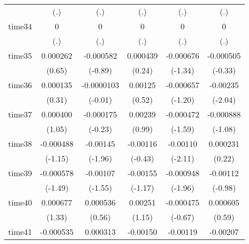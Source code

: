 \begin{table}[htbp]
\begin{tabular}{l*{5}{c}}
            &         (.)         &         (.)         &         (.)         &         (.)         &         (.)         \\
time34      &           0         &           0         &           0         &           0         &           0         \\
            &         (.)         &         (.)         &         (.)         &         (.)         &         (.)         \\
time35      &    0.000262         &   -0.000582         &    0.000439         &   -0.000676         &   -0.000505         \\
            &      (0.65)         &     (-0.89)         &      (0.24)         &     (-1.34)         &     (-0.33)         \\
time36      &    0.000135         &  -0.0000103         &     0.00125         &   -0.000657         &    -0.00235\sym{*}  \\
            &      (0.31)         &     (-0.01)         &      (0.52)         &     (-1.20)         &     (-2.04)         \\
time37      &    0.000400         &   -0.000175         &     0.00239         &   -0.000472         &   -0.000888         \\
            &      (1.05)         &     (-0.23)         &      (0.99)         &     (-1.59)         &     (-1.08)         \\
time38      &   -0.000488         &    -0.00145\sym{*}  &    -0.00116         &    -0.00110\sym{*}  &    0.000231         \\
            &     (-1.15)         &     (-1.96)         &     (-0.43)         &     (-2.11)         &      (0.22)         \\
time39      &   -0.000578         &    -0.00107         &    -0.00155         &   -0.000948\sym{*}  &    -0.00112         \\
            &     (-1.49)         &     (-1.55)         &     (-1.17)         &     (-1.96)         &     (-0.98)         \\
time40      &    0.000677         &    0.000536         &     0.00251         &   -0.000475         &    0.000605         \\
            &      (1.33)         &      (0.56)         &      (1.15)         &     (-0.67)         &      (0.59)         \\
time41      &   -0.000535         &    0.000313         &    -0.00150         &    -0.00119\sym{*}  &    -0.00207         \\

\end{tabular}
\end{table}
